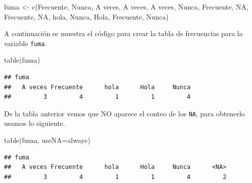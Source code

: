 \documentclass[
]{book}
\makeatletter
\newenvironment{Shaded}{\begin{snugshade}}{\end{snugshade}}
\newcommand{\AttributeTok}[1]{\textcolor[rgb]{0.77,0.63,0.00}{#1}}
\newcommand{\ConstantTok}[1]{\textcolor[rgb]{0.00,0.00,0.00}{#1}}
\newcommand{\FunctionTok}[1]{\textcolor[rgb]{0.00,0.00,0.00}{#1}}
\newcommand{\NormalTok}[1]{#1}
\newcommand{\OtherTok}[1]{\textcolor[rgb]{0.56,0.35,0.01}{#1}}
\newcommand{\StringTok}[1]{\textcolor[rgb]{0.31,0.60,0.02}{#1}}
\newenvironment{kframe}{%
\medskip{}
\setlength{\fboxsep}{.8em}
 \def\at@end@of@kframe{}%
 \ifinner\ifhmode%
  \def\at@end@of@kframe{\end{minipage}}%
  \begin{minipage}{\columnwidth}%
 \fi\fi%
 \def\FrameCommand##1{\hskip\@totalleftmargin \hskip-\fboxsep
 \colorbox{shadecolor}{##1}\hskip-\fboxsep
     \hskip-\linewidth \hskip-\@totalleftmargin \hskip\columnwidth}%
 \MakeFramed {\advance\hsize-\width
   \@totalleftmargin\z@ \linewidth\hsize
   \@setminipage}}%
 {\par\unskip\endMakeFramed%
 \at@end@of@kframe}
\renewenvironment{Shaded}{\begin{kframe}}{\end{kframe}}
\makeatother
\begin{document}
\begin{Shaded}
\begin{Highlighting}[]
\NormalTok{fuma }\OtherTok{\textless{}{-}} \FunctionTok{c}\NormalTok{(}\StringTok{\textquotesingle{}Frecuente\textquotesingle{}}\NormalTok{, }\StringTok{\textquotesingle{}Nunca\textquotesingle{}}\NormalTok{, }\StringTok{\textquotesingle{}A veces\textquotesingle{}}\NormalTok{, }\StringTok{\textquotesingle{}A veces\textquotesingle{}}\NormalTok{, }\StringTok{\textquotesingle{}A veces\textquotesingle{}}\NormalTok{,}
          \StringTok{\textquotesingle{}Nunca\textquotesingle{}}\NormalTok{, }\StringTok{\textquotesingle{}Frecuente\textquotesingle{}}\NormalTok{, }\ConstantTok{NA}\NormalTok{, }\StringTok{\textquotesingle{}Frecuente\textquotesingle{}}\NormalTok{, }\ConstantTok{NA}\NormalTok{, }\StringTok{\textquotesingle{}hola\textquotesingle{}}\NormalTok{, }
          \StringTok{\textquotesingle{}Nunca\textquotesingle{}}\NormalTok{, }\StringTok{\textquotesingle{}Hola\textquotesingle{}}\NormalTok{, }\StringTok{\textquotesingle{}Frecuente\textquotesingle{}}\NormalTok{, }\StringTok{\textquotesingle{}Nunca\textquotesingle{}}\NormalTok{)}
\end{Highlighting}
\end{Shaded}

A continuación se muestra el código para crear la tabla de frecuencias para la variable \texttt{fuma}.

\begin{Shaded}
\begin{Highlighting}[]
\FunctionTok{table}\NormalTok{(fuma)}
\end{Highlighting}
\end{Shaded}

\begin{verbatim}
## fuma
##   A veces Frecuente      hola      Hola     Nunca 
##         3         4         1         1         4
\end{verbatim}

De la tabla anterior vemos que NO aparece el conteo de los \texttt{NA}, para obtenerlo usamos lo siguiente.

\begin{Shaded}
\begin{Highlighting}[]
\FunctionTok{table}\NormalTok{(fuma, }\AttributeTok{useNA=}\StringTok{\textquotesingle{}always\textquotesingle{}}\NormalTok{)}
\end{Highlighting}
\end{Shaded}

\begin{verbatim}
## fuma
##   A veces Frecuente      hola      Hola     Nunca      <NA> 
##         3         4         1         1         4         2
\end{verbatim}
\end{document}
